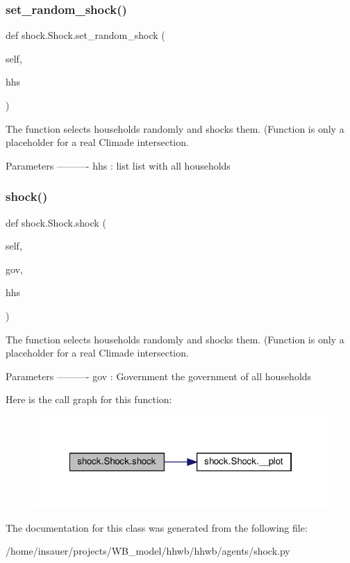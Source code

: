 \subsubsection{\texorpdfstring{set\+\_\+random\+\_\+shock()}{set\_random\_shock()}}
{\footnotesize\ttfamily def shock.\+Shock.\+set\+\_\+random\+\_\+shock (\begin{DoxyParamCaption}\item[{}]{self,  }\item[{}]{hhs }\end{DoxyParamCaption})}

\begin{DoxyVerb}The function selects households randomly and shocks them. (Function is only a
   placeholder for a real Climade intersection.

    Parameters
    ----------
    hhs : list
list with all households
\end{DoxyVerb}
 \mbox{\label{classshock_1_1Shock_aefe691acc8ddd7e1c42a70e529ce192f}} 
\subsubsection{\texorpdfstring{shock()}{shock()}}
{\footnotesize\ttfamily def shock.\+Shock.\+shock (\begin{DoxyParamCaption}\item[{}]{self,  }\item[{}]{gov,  }\item[{}]{hhs }\end{DoxyParamCaption})}

\begin{DoxyVerb}The function selects households randomly and shocks them. (Function is only a
   placeholder for a real Climade intersection.

    Parameters
    ----------
    gov : Government
the government of all households
\end{DoxyVerb}
 Here is the call graph for this function\+:\nopagebreak
\begin{figure}[H]
\begin{center}
\leavevmode
\includegraphics[width=322pt]{classshock_1_1Shock_aefe691acc8ddd7e1c42a70e529ce192f_cgraph}
\end{center}
\end{figure}


The documentation for this class was generated from the following file\+:\begin{DoxyCompactItemize}
\item 
/home/insauer/projects/\+W\+B\+\_\+model/hhwb/hhwb/agents/shock.\+py\end{DoxyCompactItemize}
